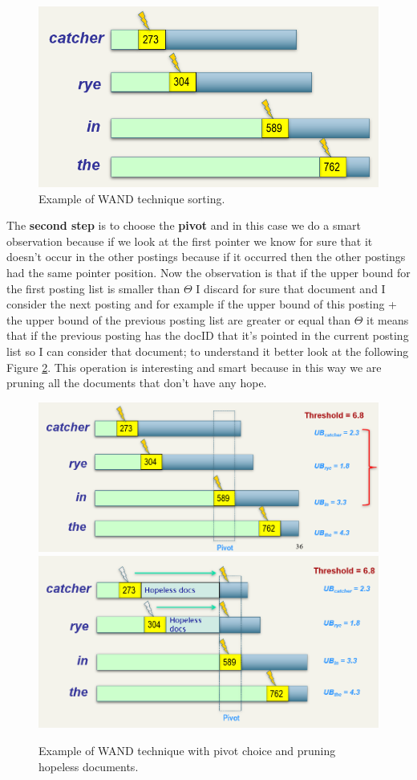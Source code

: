 \begin{figure}
    \centering
    \includegraphics[width=0.75\linewidth]{images/wand2.PNG}
    \caption{Example of WAND technique sorting.}
    \label{fig:wand2}
\end{figure}
The \textbf{second step} is to choose the \textbf{pivot} and in this case we do a smart observation because if we look at the first pointer we know for sure that it doesn't occur in the other postings because if it occurred then the other postings had the same pointer position. Now the observation is that if the upper bound for the first posting list is smaller than $\Theta$ I discard for sure that document and I consider the next posting and for example if the upper bound of this posting + the upper bound of the previous posting list are greater or equal than $\Theta$ it means that if the previous posting has the docID that it's pointed in the current posting list so I can consider that document; to understand it better look at the following Figure \ref{fig:wand3}. This operation is interesting and smart because in this way we are pruning all the documents that don't have any hope.\newline
\begin{figure}
    \centering
    \includegraphics[width=0.75\linewidth]{images/wand3.PNG}
    \includegraphics[width=0.75\linewidth]{images/wand4.PNG}
    \caption{Example of WAND technique with pivot choice and pruning hopeless documents.}
    \label{fig:wand3}
\end{figure}
